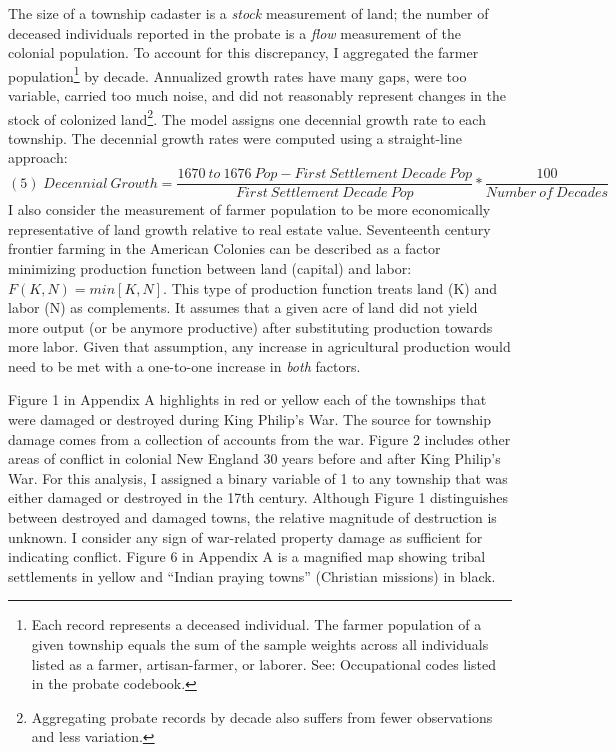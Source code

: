 \documentclass[11pt]{article}
\begin{document}
The size of a township cadaster is a {\em stock} measurement of land; the number of deceased individuals reported in the probate is a {\em flow} measurement of the colonial population. %
To account for this discrepancy, I aggregated the farmer population\footnote{Each record represents a deceased individual. The farmer population of a given township equals the sum of the sample weights across all individuals listed as a farmer, artisan-farmer, or laborer. See: Occupational codes listed in the probate codebook.} by decade.
Annualized growth rates have many gaps, were too variable, carried too much noise, and did not reasonably represent changes in the stock of colonized land\footnote{Aggregating probate records by decade also suffers from fewer observations and less variation.}. The model assigns one decennial growth rate to each township. The decennial growth rates were computed using a straight-line approach:
\[
(5)\;Decennial \ Growth=
\frac{ 1670 \ to \ 1676 \ Pop - First \ Settlement \ Decade \ Pop }{First \ Settlement \ Decade \ Pop} *
\frac{100}{Number \ of \ Decades}
\]
I also consider the measurement of farmer population to be more economically representative of land growth relative to real estate value. Seventeenth century frontier farming in the American Colonies can be described as a factor minimizing production function between land (capital) and labor: $F(K,N)=min[K,N]$. This type of production function treats land (K) and labor (N) as complements. It assumes that a given acre of land did not yield more output (or be anymore productive) after substituting production towards more labor. Given that assumption, any increase in agricultural production would need to be met with a one-to-one increase in {\em both} factors. 

Figure 1 in Appendix A highlights in red or yellow each of the townships that were damaged or destroyed during King Philip's War. The source for township damage comes from a collection of accounts from the war. Figure 2 includes other areas of conflict in colonial New England 30 years before and after King Philip's War. For this analysis, I assigned a binary variable of 1 to any township that was either damaged or destroyed in the 17th century. Although Figure 1 distinguishes between destroyed and damaged towns, the relative magnitude of destruction is unknown. I consider any sign of war-related property damage as sufficient for indicating conflict. Figure 6 in Appendix A is a magnified map showing tribal settlements in yellow and ``Indian praying towns'' (Christian missions) in black. 
\end{document}
